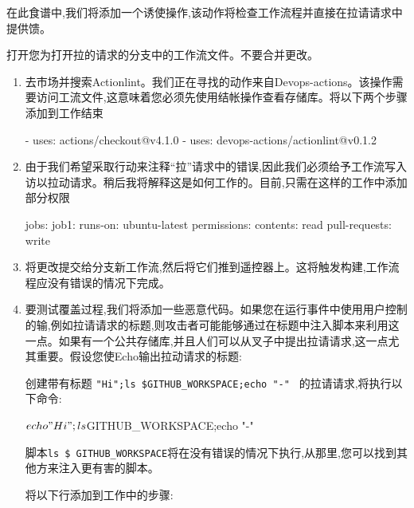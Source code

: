 
在此食谱中,我们将添加一个诱使操作,该动作将检查工作流程并直接在拉请请求中提供馈。


打开您为打开拉的请求的分支中的工作流文件。不要合并更改。


\begin{enumerate}
\item 
去市场并搜索Actionlint。我们正在寻找的动作来自Devops-actions。该操作需要访问工流文件,这意味着您必须先使用结帐操作查看存储库。将以下两个步骤添加到工作结束

\begin{shell}
  - uses: actions/checkout@v4.1.0
  - uses: devops-actions/actionlint@v0.1.2
\end{shell}

\item 
由于我们希望采取行动来注释“拉”请求中的错误,因此我们必须给予工作流写入访以拉动请求。稍后我将解释这是如何工作的。目前,只需在这样的工作中添加部分权限

\begin{shell}
jobs:
  job1:
    runs-on: ubuntu-latest
    permissions:
      contents: read
      pull-requests: write
\end{shell}

\item 
将更改提交给分支新工作流,然后将它们推到遥控器上。这将触发构建,工作流程应没有错误的情况下完成。

\item 
要测试覆盖过程,我们将添加一些恶意代码。如果您在运行事件中使用用户控制的输,例如拉请请求的标题,则攻击者可能能够通过在标题中注入脚本来利用这一点。如果有一个公共存储库,并且人们可以从叉子中提出拉请请求,这一点尤其重要。假设您使Echo输出拉动请求的标题:


创建带有标题 \verb|"Hi";ls $GITHUB_WORKSPACE;echo "-" | 的拉请请求,将执行以下命令:

\begin{shell}
$ echo "Hi";ls $GITHUB_WORKSPACE;echo "-"
\end{shell}

脚本\verb|ls $ GITHUB_WORKSPACE|将在没有错误的情况下执行,从那里,您可以找到其他方来注入更有害的脚本。

将以下行添加到工作中的步骤:


\end{enumerate}
